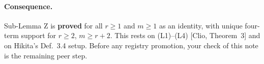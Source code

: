 \documentclass[11pt]{article}
\theoremstyle{definition}
\begin{document}
\paragraph{Consequence.} Sub-Lemma Z is \textbf{proved} for all $r\ge1$ and $m\ge1$ as an identity,
with unique four-term support for $r\ge2$, $m\ge r+2$. This rests on (L1)--(L4) [Clio,
Theorem~3] and on Hikita's Def.~3.4 setup. Before any registry promotion, your check of
this note is the remaining peer step.
\end{document}
